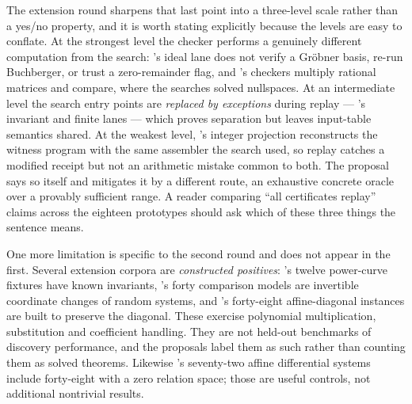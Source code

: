 The extension round sharpens that last point into a three-level scale rather
than a yes/no property, and it is worth stating explicitly because the levels
are easy to conflate. At the strongest level the checker performs a genuinely
different computation from the search: 's ideal lane does not verify a
Gr\"obner basis, re-run Buchberger, or trust a zero-remainder flag, and
's checkers multiply rational matrices and compare, where the searches
solved nullspaces. At an intermediate level the search entry points are
\emph{replaced by exceptions} during replay --- 's invariant and finite
lanes --- which proves separation but leaves input-table semantics shared. At
the weakest level, 's integer projection reconstructs the witness
program with the same assembler the search used, so replay catches a modified
receipt but not an arithmetic mistake common to both. The proposal says so
itself and mitigates it by a different route, an exhaustive concrete oracle over
a provably sufficient range. A reader comparing ``all certificates replay''
claims across the eighteen prototypes should ask which of these three things
the sentence means.

One more limitation is specific to the second round and does not appear in the
first. Several extension corpora are \emph{constructed positives}: 's
twelve power-curve fixtures have known invariants, 's forty comparison
models are invertible coordinate changes of random systems, and 's
forty-eight affine-diagonal instances are built to preserve the diagonal. These
exercise polynomial multiplication, substitution and coefficient handling. They
are not held-out benchmarks of discovery performance, and the proposals label
them as such rather than counting them as solved theorems. Likewise 's
seventy-two affine differential systems include forty-eight with a zero relation
space; those are useful controls, not additional nontrivial results.

